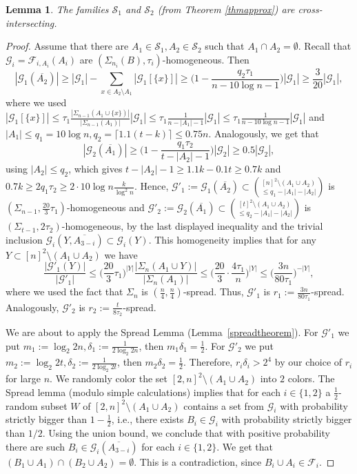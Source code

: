 \documentclass[11pt]{extarticle}
\numberwithin{equation}{section} %
\theoremstyle{plain}
\newtheorem{lem}[thm]{Lemma}
\theoremstyle{definition}
\newcommand{\FF}{\mathcal{F}}
\newcommand{\ff}{\mathcal{F}}
\newcommand{\m}{\mathcal}
\begin{document}
\begin{lem}\label{leminters}
    The families $\m{S}_1$ and $\m{S}_2$ (from Theorem \ref{thmapprox}) are cross-intersecting. 
\end{lem}
\begin{proof}
    Assume that there are  $A_1 \in \m{S}_1, A_2 \in \m{S}_2$ such that $A_1 \cap A_2 = \emptyset.$ Recall that $\m{G}_i=\FF_{i, A_i}(A_i)$ are $(\Sigma_{n_i}(B), \tau_i)$-homogeneous. 
    Then
    $$
    |\m{G}_1(\overline{A_2})|\geq |\m{G}_1|-\sum_{x\in A_2\setminus A_1} |\m{G}_1[\{x\}]|\ge \Big(1-\frac {q_2 \tau_1}{n-10\log{n}-1}\Big) |\m{G}_1|\ge \frac{3}{20}|\m{G}_1|,
    $$
    where we used $|\m{G}_1[\{x\}]| \leq \tau_1 \frac{|\Sigma_{n-1}(A_1 \cup \{ x\})|}{|\Sigma_{n-1}(A_1)|}|\m{G}_1| \leq \tau_1 \frac{1}{n-|A_1|-1}|\m{G}_1| \leq \tau_1 \frac{1}{n-10\log{n}-1}|\m{G}_1|$ and $|A_1|\leq q_1 = 10\log{n}, q_2 = \lceil1.1(t-k)\rceil \leq 0.75n$. Analogously, we get that 
$$|\m{G}_2(\overline{A_1})| \geq \Big(1-\frac {q_1 \tau_2}{t-|A_2|-1}\Big) |\m{G}_2|\geq 0.5|\m{G}_2|,
$$ using $|A_2|\leq q_2$, which gives $t-|A_2|-1\geq 1.1k - 0.1t \geq 0.7k$ and $0.7k \geq 2q_1\tau_2\geq2\cdot 10\log{n} \frac{k}{\log^2{n}}$. 
Hence, $\m{G}'_1 :=\m{G}_1(\overline{A_{2}}) \subset {[n]^2\setminus (A_1 \cup A_2) \choose \leq q_1-|A_1|-|A_2|}$ is $(\Sigma_{n-1}, \frac{20}{3}\tau_1)$-homogeneous and $\m{G}'_2:=\m{G}_2(\overline{A_{1}})\subset {[t]^2\setminus (A_1 \cup A_2) \choose \leq q_2-|A_1|-|A_2|}$ is $(\Sigma_{t-1}, 2\tau_2)$-homogeneous, by the last displayed inequality and the trivial inclusion $\m{G}_i(Y, \overline{A_{3-i}}) \subset \m{G}_i(Y)$. This homogeneity implies that for any $Y \subset [n]^2\setminus(A_1\cup A_2)$ we have
$$
\frac{|\m{G}'_1(Y)|}{|\m{G}'_1|} \leq \Big(\frac{20}{3}\tau_1\Big)^{|Y|} \frac{|\Sigma_n(A_1 \cup Y)|}{|\Sigma_n(A_1)|} \leq \Big(\frac{20}{3} \cdot\frac{4\tau_1}{n} \Big)^{|Y|} \leq \Big( \frac{3n}{80\tau_1} \Big)^{-|Y|},
$$
where we used the fact that $\Sigma_n$ is $(\frac{n}{4}, \frac{n}{4})$-spread. Thus, $\m{G}'_1$ is $r_1:=\frac{3n}{80\tau_1}$-spread. Analogously, $\m{G}'_2$ is  $r_2:=\frac{t}{8\tau_2}$-spread.

    We are about to apply the Spread Lemma (Lemma~\ref{spreadtheorem}). For $\m{G}'_1$ we put $m_1 := \log_2{2n}, \delta_1:=\frac{1}{2\log_2{2n}}$, then $m_1\delta_1 = \frac{1}{2}$. For $\m{G}'_2$ we put $m_2 := \log_2{2t}, \delta_2:=\frac{1}{2\log_2{2t}}$, then $m_2\delta_2 = \frac{1}{2}$. Therefore, $r_i\delta_i > 2^{4}$ by our choice of $r_i$ for large $n$.  We randomly color the set $[2,n]^2\setminus(A_1 \cup A_2)$ into $2$ colors. The Spread lemma (modulo simple calculations) implies that for each $i \in \{ 1,2 \}$ a $\frac{1}{2}$-random subset $W$ of $[2,n]^2\setminus(A_1 \cup A_2)$ contains a set from $\m{G}_i$ with probability strictly bigger than $1 - \frac{1}{2}$, i.e., there exists $B_i \in \m{G}_i$  with probability strictly bigger than $1/2$. Using the union bound, we conclude that with positive probability there are such $B_i \in \m{G}_i(\overline{A_{3-i}})$ for each $i \in \{ 1,2 \}$. We get that $(B_1\cup A_1)\cap (B_2\cup A_2)=\emptyset$. This is a contradiction, since $B_i\cup A_i\in \ff_i$.
\end{proof}
\end{document}
